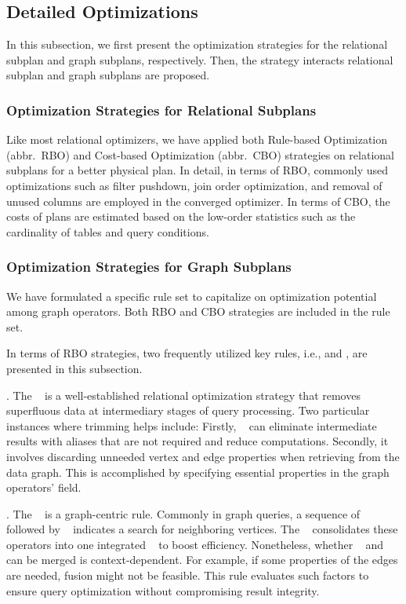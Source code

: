 \subsection{Detailed Optimizations}
\label{sec:detailed-optimizations}

In this subsection, we first present the optimization strategies for the relational subplan and graph subplans, respectively.
Then, the strategy interacts relational subplan and graph subplans are proposed.

\subsubsection{Optimization Strategies for Relational Subplans}

Like most relational optimizers, we have applied both Rule-based Optimization (abbr.~RBO) and Cost-based Optimization (abbr.~CBO) strategies on relational subplans for a better physical plan.
In detail, in terms of RBO, commonly used optimizations such as filter pushdown, join order optimization, and removal of unused columns are employed in the converged optimizer.
In terms of CBO, the costs of plans are estimated based on the low-order statistics such as the cardinality of tables and query conditions.



\subsubsection{Optimization Strategies for Graph Subplans}

We have formulated a specific rule set to capitalize on optimization potential among graph operators. 
Both RBO and CBO strategies are included in the rule set.

In terms of RBO strategies, two frequently utilized key rules, i.e., \trimrule and \fusionrule, are presented in this subsection.

\trimrule. 
The \trimrule~ is a well-established relational optimization strategy that removes superfluous data at intermediary stages of query processing. 
Two particular instances where trimming helps include: 
Firstly, \trimrule~ can eliminate intermediate results with aliases that are not required and reduce computations.
Secondly, it involves discarding unneeded vertex and edge properties when retrieving from the data graph. 
This is accomplished by specifying essential properties in the graph operators’  field.

\fusionrule. 
The \fusionrule~ is a graph-centric rule. 
Commonly in graph queries, a sequence of \expandedge~ followed by \getvertex~ indicates a search for neighboring vertices. 
The \fusionrule~ consolidates these operators into one integrated \expandvertex~ to boost efficiency. 
Nonetheless, whether \expandedge~ and \getvertex~ can be merged is context-dependent. 
For example, if some properties of the edges are needed, fusion might not be feasible.
This rule evaluates such factors to ensure query optimization without compromising result integrity.


